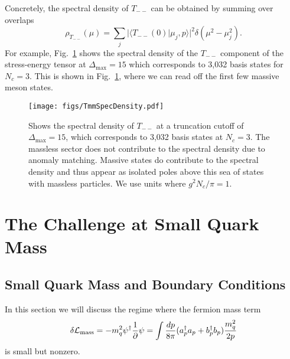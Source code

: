 \documentclass[12pt]{article}
\newcommand{\CL}{{\cal L}}
\newcommand\De\Delta
\newcommand{\p}{\partial}
\newcommand{\Dmax}{\De_{\max}}
\begin{document}
 Concretely, the spectral density of $T_{--}$ can be obtained by summing over overlaps 
 \begin{equation}\label{eq:spectralDensityDefinition}
	\rho_{T_{--}}(\mu) = \sum_j | \langle T_{--}(0) | \mu_j, p \rangle |^2 \delta(\mu^2 - \mu_j^2).
\end{equation} 
For example, Fig.~\ref{fig:TmmSpecDensity} shows the spectral density of the $T_{--}$ component of the stress-energy tensor at $\Dmax = 15$ which corresponds to  3,032 basis states for $N_c = 3$. 
This is shown in Fig.~\ref{fig:TmmSpecDensity}, where we can read off the first few massive meson states.




\begin{figure}[htbp]
\centering
\texttt{[image: figs/TmmSpecDensity.pdf]}
\caption{\label{fig:TmmSpecDensity}Shows the spectral density of $T_{--}$ at a truncation cutoff of $\Dmax = 15$, which corresponds to 3,032 basis states at $N_c = 3$. The massless sector does not contribute to the spectral density due to anomaly matching. Massive states do contribute to the spectral density and thus appear as isolated poles above this sea of states with massless particles. We use units where $g^2 N_c/\pi =1$.
}
\end{figure}



\section{The Challenge at Small Quark Mass}
\label{chiralLargeN}
\subsection{Small Quark Mass and Boundary Conditions}

In this section we will discuss the regime where the fermion mass term
\begin{equation}
\label{eq:ferimon-mass}
\delta\CL_{\rm mass} = -m_q^2 \psi^\dagger \frac{1}{\p} \psi
= \int \frac{dp}{8\pi} (a_p^\dagger a_p + b_p^\dagger b_p) \frac{m_q^2}{2p}
\end{equation}
is small but nonzero. 
\end{document}
